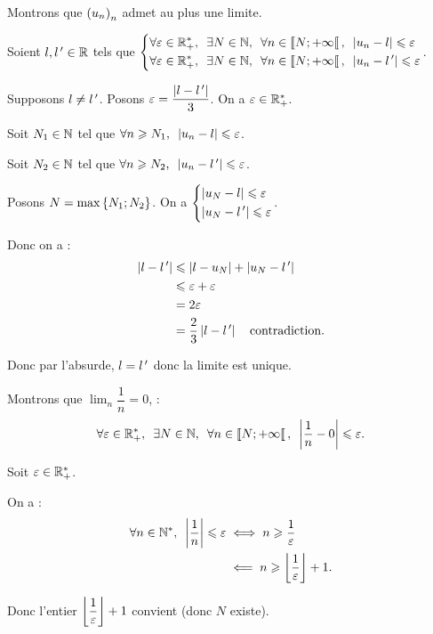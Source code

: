 \begin{dem}
Montrons que \(\left(u_n\right)_n\) admet au plus une limite.

Soient \(l,l^{\,\prime}\in\mathbb{R}\) tels que \(\begin{dcases}
\quantifs{\forall\epsilon\in\Rps;\exists N\in\N;\forall n\in\interventierie{N}{\pinf}}\abs{u_n-l}\leq\epsilon \\
\quantifs{\forall\epsilon\in\Rps;\exists N\in\N;\forall n\in\interventierie{N}{\pinf}}\abs{u_n-l\prim}\leq\epsilon
\end{dcases}\).

Supposons \(l\not=l^{\,\prime}\). Posons \(\varepsilon=\dfrac{\left\lvert l-l^{\,\prime}\right\rvert}{3}\). On a \(\varepsilon\in\mathbb{R}_+^*\).

Soit \(N_1\in\mathbb{N}\) tel que \(\quantifs{\forall n\geq N_1}\abs{u_n-l}\leq\epsilon\).

Soit \(N_2\in\mathbb{N}\) tel que \(\quantifs{\forall n\geq N_2}\abs{u_n-l\prim}\leq\epsilon\).

Posons \(N=\max\left\lbrace N_1;N_2\right\rbrace\). On a \(\begin{dcases}\left\lvert u_N-l\right\rvert\leqslant\varepsilon \\ \left\lvert u_N-l^{\,\prime}\right\rvert\leqslant\varepsilon\end{dcases}\).

Donc on a : \[\begin{aligned}
\left\lvert l-l^{\,\prime}\right\rvert&\leqslant\left\lvert l-u_N\right\rvert+\left\lvert u_N-l^{\,\prime}\right\rvert \\
&\leqslant\varepsilon+\varepsilon \\
&=2\varepsilon \\
&=\dfrac{2}{3}\left\lvert l-l^{\,\prime}\right\rvert\quad\text{contradiction.}
\end{aligned}\]

Donc par l'absurde, \(l=l^{\,\prime}\) donc la limite est unique.
\end{dem}

\begin{ex}
Montrons que \(\lim_{n}\dfrac{1}{n}=0\), \cad : \[\quantifs{\forall\epsilon\in\Rps;\exists N\in\N;\forall n\in\interventierie{N}{\pinf}}\abs{\dfrac{1}{n}-0}\leq\epsilon.\]

Soit \(\varepsilon\in\mathbb{R}_+^*\).

On a : \[\begin{aligned}
\quantifs{\forall n\in\Ns}\abs{\dfrac{1}{n}}\leq\epsilon&\ssi n\geq\dfrac{1}{\epsilon} \\
&\impr n\geq\floor{\dfrac{1}{\epsilon}}+1.
\end{aligned}\]

Donc l'entier \(\left\lfloor\dfrac{1}{\varepsilon}\right\rfloor+1\) convient (donc \(N\) existe).
\end{ex}

